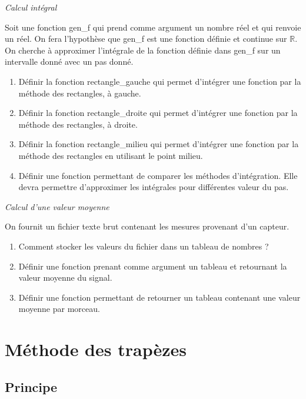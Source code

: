\documentclass[10pt]{article}
\begin{document}
\begin{exemple}
\textit{Calcul intégral}

Soit une fonction \textsf{gen\_f} qui prend comme argument un nombre réel et qui renvoie un réel. On fera l'hypothèse que \textsf{gen\_f} est une fonction définie  et continue sur $\mathbb{R}$. On cherche à approximer l'intégrale de la fonction définie dans \textsf{gen\_f} sur un intervalle donné avec un pas donné. 

\begin{enumerate}
\item Définir la fonction \textsf{rectangle\_gauche} qui permet d'intégrer une fonction par la méthode des rectangles, à gauche.
\item Définir la fonction \textsf{rectangle\_droite} qui permet d'intégrer une fonction par la méthode des rectangles, à droite.
\item Définir la fonction \textsf{rectangle\_milieu} qui permet d'intégrer une fonction par la méthode des rectangles en utilisant le point milieu.
\item Définir une fonction permettant de comparer les méthodes d'intégration. Elle devra permettre d'approximer les intégrales pour différentes valeur du pas. 
\end{enumerate}
\end{exemple}

\begin{exemple}
\textit{Calcul d'une valeur moyenne}

On fournit un fichier texte brut contenant les mesures provenant d'un capteur. 
\begin{enumerate}
\item Comment stocker les valeurs du fichier dans un tableau de nombres ?
\item Définir une fonction prenant comme argument un tableau et retournant la valeur moyenne du signal. 
\item Définir une fonction permettant de retourner un tableau contenant une valeur moyenne par morceau.
\end{enumerate}

\end{exemple}

  
\section{Méthode des trapèzes}
\subsection{Principe}
\end{document}
